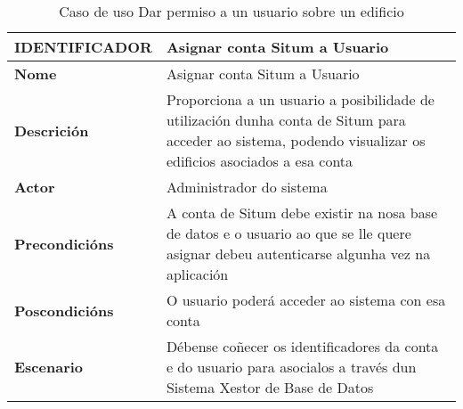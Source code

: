 \begin{table}[tbp]
	\begin{tabular}{|l|p{10cm}|}
		\hline 
		\textbf{IDENTIFICADOR}	& \textbf{Asignar conta Situm a Usuario} \\ 
		\hline 
		\textbf{Nome} & Asignar conta Situm a Usuario \\ 
		\hline 
		\textbf{Descrición} & Proporciona a un usuario a posibilidade de utilización dunha conta de Situm para acceder ao sistema, podendo visualizar os edificios asociados a esa conta \\ 
		\hline 
		\textbf{Actor} & Administrador do sistema \\ 
		\hline 
		\textbf{Precondicións} & A conta de Situm debe existir na nosa base de datos e o usuario ao que se lle quere asignar debeu autenticarse algunha vez na aplicación \\ 
		\hline 
		\textbf{Poscondicións} & O usuario poderá acceder ao sistema con esa conta \\ 
		\hline 
		\textbf{Escenario} & Débense coñecer os identificadores da conta e do usuario para asocialos a través dun Sistema Xestor de Base de Datos \\ 
		\hline 
	\end{tabular}
	\caption{Caso de uso Dar permiso a un usuario sobre un edificio}
	\label{tab:cuAsignarContaSitumUsuario}
\end{table}